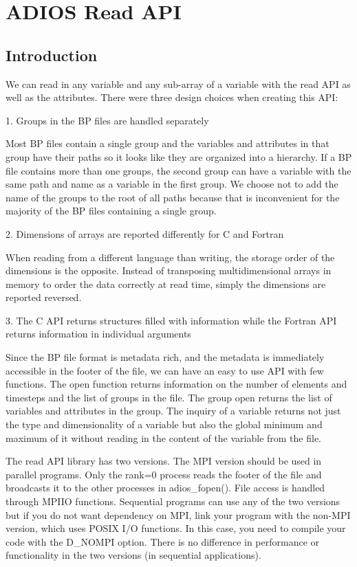 \chapter{ADIOS Read API}

\section{Introduction}

We can read in any variable and any sub-array of a variable with the read API as 
well as the attributes. There were three design choices when creating this API:

1. Groups in the BP files are handled separately

\leftskip=22pt
Most BP files contain a single group and the variables and attributes in that group 
have their paths so it looks like they are organized into a hierarchy. If a BP 
file contains more than one groups, the second group can have a variable with the 
same path and name as a variable in the first group. We choose not to add the name 
of the groups to the root of all paths because that is inconvenient for the majority 
of the BP files containing a single group.

\leftskip=0pt
2. Dimensions of arrays are reported differently for C and Fortran

\leftskip=22pt
When reading from a different language than writing, the storage order of the dimensions 
is the opposite. Instead of transposing multidimensional arrays in memory to order 
the data correctly at read time, simply the dimensions are reported reversed. 

\leftskip=0pt
3. The C API returns structures filled with information while the Fortran API returns 
information in individual arguments

\leftskip=22pt
Since the BP file format is metadata rich, and the metadata is immediately accessible 
in the footer of the file, we can have an easy to use API with few functions. The 
open function returns information on the number of elements and timesteps and the 
list of groups in the file. The group open returns the list of variables and attributes 
in the group. The inquiry of a variable returns not just the type and dimensionality 
of a variable but also the global minimum and maximum of it without reading in 
the content of the variable from the file. 

\leftskip=0pt
The read API library has two versions. The MPI version should be used in parallel 
programs. Only the rank=0 process reads the footer of the file and broadcasts it 
to the other processes in adios\_fopen(). File access is handled through MPI\-{}IO 
functions. Sequential programs can use any of the two versions but if you do not 
want dependency on MPI, link your program with the non-MPI version, which uses 
POSIX I/O functions. In this case, you need to compile your code with the \-{}D\_NOMPI 
option. There is no difference in performance or functionality in the two versions 
(in sequential applications). 

